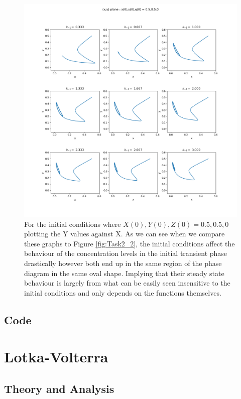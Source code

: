 \documentclass[11pt,a4paper]{CLabBookTemplate} %
\begin{document}
\begin{figure}[h!]
	\centering
	\includegraphics[width = 160mm]{Figures/Task2_4.png}
	\caption{For the initial conditions where $X(0),Y(0),Z(0) = 0.5,0.5,0$ plotting the Y values against X. As we can see when we compare these graphs to Figure \ref{fig:Task2_2}, the initial conditions affect the behaviour of the concentration levels in the initial transient phase drastically however both end up in the same region of the phase diagram in the same oval shape. Implying that their steady state behaviour is largely from what can be easily seen insensitive to the initial conditions and only depends on the functions themselves.}
	\label{fig:Task2_4}
\end{figure}


\clearpage
\subsection{Code}




\newpage
\section{Lotka-Volterra}
\subsection{Theory and Analysis}
\end{document}
